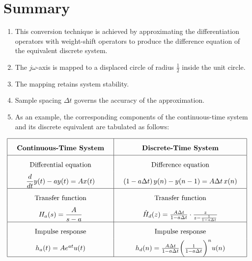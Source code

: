 \documentclass{article}
\begin{document}
\section{Summary}
\begin{enumerate}
    \item This conversion technique is achieved by approximating the differentiation operators with weight-shift operators to produce the difference equation of the equivalent discrete system.
    \item The \(j\omega\)-axis is mapped to a displaced circle of radius \(\frac{1}{2}\) inside the unit circle.
    \item The mapping retains system stability.
    \item Sample spacing \(\Delta t\) governs the accuracy of the approximation.
    \item As an example, the corresponding components of the continuous-time system and its discrete equivalent are tabulated as follows:
\end{enumerate}
\[
\renewcommand{\arraystretch}{2}
\setlength{\arraycolsep}{14pt}

\begin{array}{|c|c|}
\hline
\textbf{Continuous-Time System} &
\textbf{Discrete-Time System} \\
\hline

\text{Differential equation} &
\text{Difference equation} \\

\dfrac{d}{dt}y(t)-ay(t)=Ax(t)
&
(1-a\Delta t)\,y(n)-y(n-1)=A\Delta t\,x(n)
\\
\hline

\text{Transfer function} &
\text{Transfer function} \\

H_a(s)=\dfrac{A}{s-a}
&
\hat{H}_d(z)=\frac{A\Delta t}{1-a\Delta t}\cdot\frac{z}{z-\frac{1}{1-a\Delta t}}
\\
\hline

\text{Impulse response} &
\text{Impulse response} \\

h_a(t)=Ae^{at}u(t)
&
h_d(n)=\frac{A\Delta t}{1-a\Delta t}\bigg(\frac{1}{1-a\Delta t}\bigg)^nu(n)
\\
\hline
\end{array}
\]
\end{document}
